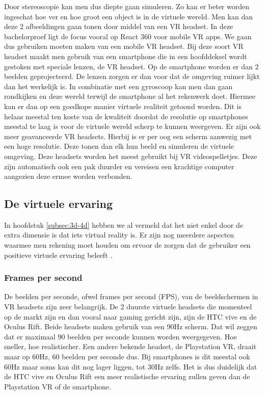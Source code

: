 Door stereoscopie kan men dus diepte gaan simuleren. Zo kan er beter worden ingeschat hoe ver en hoe groot een object is in de virtuele wereld. Men kan dan deze 2 afbeeldingen gaan tonen door middel van een VR headset. In deze bachelorproef ligt de focus vooral op React 360 voor mobile VR apps. We gaan dus gebruiken moeten maken van een mobile VR headset. Bij deze soort VR headset maakt men gebruik van een smartphone die in een hoofddeksel wordt gestoken met speciale lenzen, de VR headset. Op de smartphone worden er dan 2 beelden geprojecteerd. De lenzen zorgen er dan voor dat de omgeving ruimer lijkt dan het werkelijk is. In combinatie met een gyroscoop kan men dan gaan rondkijken en deze wereld terwijl de smartphone al het rekenwerk doet. Hiermee kan er dan op een goedkope manier virtuele realiteit getoond worden. Dit is helaas meestal ten koste van de kwaliteit doordat de resolutie op smartphones meestal te laag is voor de virtuele wereld scherp te kunnen weergeven. Er zijn ook meer geavanceerde VR headsets. Hierbij is er per oog een scherm aanwezig met een hoge resolutie. Deze tonen dan elk hun beeld en simuleren de virtuele omgeving. Deze headsets worden het meest gebruikt bij VR videospelletjes. Deze zijn automatisch ook een pak duurder en vereisen een krachtige computer aangezien deze ermee worden verbonden.

\subsection{De virtuele ervaring}
\label{subsec:vr-ervaring}
In hoofdstuk \ref{subsec:3d-4d} hebben we al vermeld dat het niet enkel door de extra dimensie is dat iets virtual reality is. Er zijn nog meerdere aspecten waarmee men rekening moet houden om ervoor de zorgen dat de gebruiker een positieve virtuele ervaring beleeft \autocite{Mullis2016}.

\subsubsection{Frames per second}
\label{ssubsec:fps}
De beelden per seconde, ofwel frames per second (FPS), van de beeldschermen in VR headsets zijn zeer belangrijk. De 2 duurste virtuele headsets die momenteel op de markt zijn en dan vooral naar gaming gericht zijn, zijn de HTC vive en de Oculus Rift. Beide headsets maken gebruik van een 90Hz scherm. Dat wil zeggen dat er maximaal 90 beelden per seconde kunnen worden weergegeven. Hoe sneller, hoe realistischer. Een andere bekende headset, de Playstation VR, draait maar op 60Hz, 60 beelden per seconde dus. Bij smartphones is dit meestal ook 60Hz maar soms kan dit nog lager liggen, tot 30Hz zelfs. Het is dus duidelijk dat de HTC vive en Oculus Rift een meer realistische ervaring zullen geven dan de Playstation VR of de smartphone.

